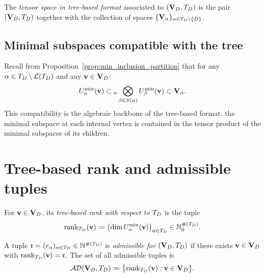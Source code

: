 \begin{definition}
\label{def:TBT_space}
The \emph{tensor space in tree-based format} associated to $(\mathbf{V}_D, T_D)$
is the pair $(\mathbf{V}_D, T_D)$ together with the collection of spaces
$\{\mathbf{V}_\alpha\}_{\alpha \in T_D \setminus \{D\}}$.
\end{definition}

\subsection*{Minimal subspaces compatible with the tree}

Recall from Proposition~\ref{prop:min_inclusion_partition} that
for any $\alpha \in T_D \setminus \mathcal{L}(T_D)$ and any
$\mathbf{v} \in \mathbf{V}_D$:
\begin{equation}
\label{eq:min_compat_tree}
    U^{\min}_{\alpha}(\mathbf{v})
    \subset {}_a\bigotimes_{\beta \in S(\alpha)} U^{\min}_{\beta}(\mathbf{v})
    \subset \mathbf{V}_\alpha.
\end{equation}
This compatibility is the algebraic backbone of the tree-based format:
the minimal subspace at each internal vertex is contained in the tensor
product of the minimal subspaces of its children.

\section{Tree-based rank and admissible tuples}
\label{sec:algTBT:tbrank}

\begin{definition}
\label{def:TBT_rank}
For $\mathbf{v} \in \mathbf{V}_D$, its \emph{tree-based rank with respect to $T_D$} is
the tuple
\begin{equation}
\label{eq:TBT_rank}
    \mathrm{rank}_{T_D}(\mathbf{v})
    \coloneqq \bigl(\dim U^{\min}_{\alpha}(\mathbf{v})\bigr)_{\alpha \in T_D}
    \in \mathbb{N}_0^{\#(T_D)}.
\end{equation}
\end{definition}

\begin{definition}
\label{def:TBT_admissible}
A tuple $\mathfrak{r} = (r_\alpha)_{\alpha \in T_D} \in \mathbb{N}^{\#(T_D)}$ is
\emph{admissible for $(\mathbf{V}_D, T_D)$} if there exists $\mathbf{v} \in \mathbf{V}_D$ with
$\mathrm{rank}_{T_D}(\mathbf{v}) = \mathfrak{r}$. The set of all admissible tuples is
\begin{equation}
\label{eq:TBT_admissible}
    \mathcal{AD}(\mathbf{V}_D,T_D) \coloneqq
    \bigl\{
        \mathrm{rank}_{T_D}(\mathbf{v}) : \mathbf{v} \in \mathbf{V}_D
    \bigr\}.
\end{equation}
\end{definition}


